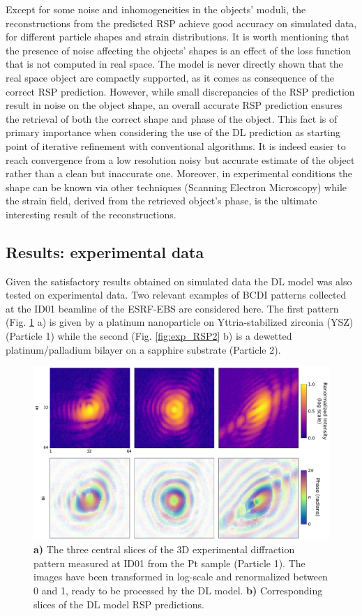 Except for some noise and inhomogeneities in the objects' moduli, the reconstructions from the predicted RSP achieve 
good accuracy on simulated data, for different particle shapes and strain distributions. It is worth mentioning that 
the presence of noise affecting the objects' shapes is an effect of the loss function that is not computed in real space. 
The model is never directly shown that the real space object are compactly supported, as it comes as consequence of the  
correct RSP prediction. However, while small discrepancies of the RSP prediction result in noise on the object shape, 
an overall accurate RSP prediction ensures the retrieval of both the correct shape and phase of the object. This fact is 
of primary importance when considering the use of the DL prediction as starting point of iterative refinement with 
conventional algorithms. It is indeed easier to reach convergence from a low resolution noisy but accurate estimate of 
the object rather than a clean but inaccurate one. Moreover, in experimental conditions the shape can be known via other 
techniques (Scanning Electron Microscopy) while the strain field, derived from the retrieved object's phase, is the 
ultimate interesting result of the reconstructions.

\subsection{Results: experimental data}\label{chp:phasing_results}
Given the satisfactory results obtained on simulated data the DL model was also tested on experimental data. 
Two relevant examples of BCDI patterns collected at the ID01 beamline of the ESRF-EBS are considered here. 
The first pattern (Fig. \ref{fig:exp_RSP1} a) is given by a platinum nanoparticle on Yttria-stabilized zirconia (YSZ) 
(Particle 1) while the second (Fig. \ref{fig:exp_RSP2} b) is a dewetted platinum/palladium bilayer on a sapphire substrate
(Particle 2). 

\begin{figure}[H]
    \centering
    \includegraphics[width=\textwidth]{figures/Phasing/exp_data1.pdf}
    \caption{\textbf{a)} The three central slices of the 3D experimental diffraction pattern measured at ID01 from the Pt sample 
    (Particle 1). The images have been transformed in log-scale and renormalized between 0 and 1, ready to be processed 
    by the DL model. \textbf{b)} Corresponding slices of the DL model RSP predictions. }
    \label{fig:exp_RSP1}
\end{figure}

